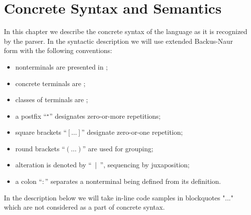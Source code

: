 \chapter{Concrete Syntax and Semantics}
\label{sec:concrete_syntax}

In this chapter we describe the concrete syntax of the language as it is recognized by the parser. In the
syntactic description we will use extended Backus-Naur form with the following conventions:

\begin{itemize}
\item nonterminals are presented in ;
\item concrete terminals are ;
\item classes of terminals are ;
\item a postfix ``$^\star$'' designates zero-or-more repetitions;
\item square brackets ``$[\dots]$'' designate zero-or-one repetition;
\item round brackets ``$(\dots)$'' are used for grouping;
\item alteration is denoted by ``$\:\:\mid\:\:$'', sequencing by juxaposition;
\item a colon ``$:$'' separates a nonterminal being defined from its definition.
\end{itemize}

In the description below we will take in-line code samples in blockquotes "..." which are not considered as a
part of concrete syntax.









